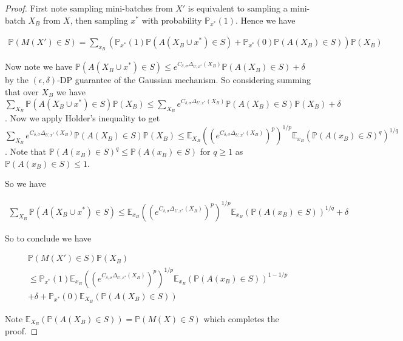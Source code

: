 \begin{proof}
    
First note sampling mini-batches from $X'$ is equivalent to sampling a mini-batch $X_B$ from $X$, then sampling $x^*$ with probability $\mathbb{P}_{x^*}(1)$. Hence we have  

\begin{multline*}
    \mathbb{P}(M(X') \in S) = \sum_{x_B} (\mathbb{P}_{x^*}(1) \mathbb{P}(A(X_B \cup x^*) \in S) + \mathbb{P}_{x^*}(0) \mathbb{P}(A(X_B) \in S))\mathbb{P}(X_B)
\end{multline*}

Now note we have $\mathbb{P}(A(X_B \cup x^*) \in S) \leq e^{C_{\delta,\sigma}\Delta_{U,x^*}(X_B)} \mathbb{P}(A(X_B) \in S) + \delta$ by the $(\epsilon,\delta)$-DP guarantee of the Gaussian mechanism. So considering summing that over $X_B$ we have $\sum_{X_B} \mathbb{P}(A(X_B \cup x^*) \in S) \mathbb{P}(X_B) \leq \sum_{X_B} e^{C_{\delta,\sigma} \Delta_{U,x^*}(X_B)} \mathbb{P}(A(X_B) \in S) \mathbb{P}(X_B) + \delta$. Now we apply Holder's inequality to get $\sum_{X_B} e^{C_{\delta,\sigma} \Delta_{U,x^*}(X_B)} \mathbb{P}(A(X_B) \in S) \mathbb{P}(X_B) \leq \mathbb{E}_{X_B}((e^{C_{\delta,\sigma} \Delta_{U,x^*}(X_B)})^{p})^{1/p} \mathbb{E}_{x_B}(\mathbb{P}(A(x_B) \in S)^{q})^{1/q}$. Note that $\mathbb{P}(A(x_B) \in S)^{q} \leq \mathbb{P}(A(x_B) \in S)$ for $q \geq 1$ as $\mathbb{P}(A(x_B) \in S) \leq 1$. 


So we have 

\begin{multline}
\sum_{X_B} \mathbb{P}(A(X_B \cup x^*) \in S) \leq \mathbb{E}_{x_B}((e^{C_{\delta,\sigma} \Delta_{U,x^*}(X_B)})^{p})^{1/p} \mathbb{E}_{x_B}(\mathbb{P}(A(x_B) \in S))^{1/q} + \delta
\end{multline}

So to conclude we have

\begin{multline}
    \mathbb{P}(M(X') \in S) \mathbb{P}(X_B) \\ 
    \leq \mathbb{P}_{x^*}(1) \mathbb{E}_{x_B}((e^{C_{\delta,\sigma} \Delta_{U,x^*}(X_B)})^{p})^{1/p} \mathbb{E}_{x_B}(\mathbb{P}(A(x_B) \in S))^{1-1/p} \\ + \delta + \mathbb{P}_{x^*}(0) \mathbb{E}_{X_B}(\mathbb{P}(A(X_B) \in S))
\end{multline}

Note $\mathbb{E}_{X_B}(\mathbb{P}(A(X_B) \in S)) = \mathbb{P}(M(X) \in S)$ which completes the proof.


\end{proof}

